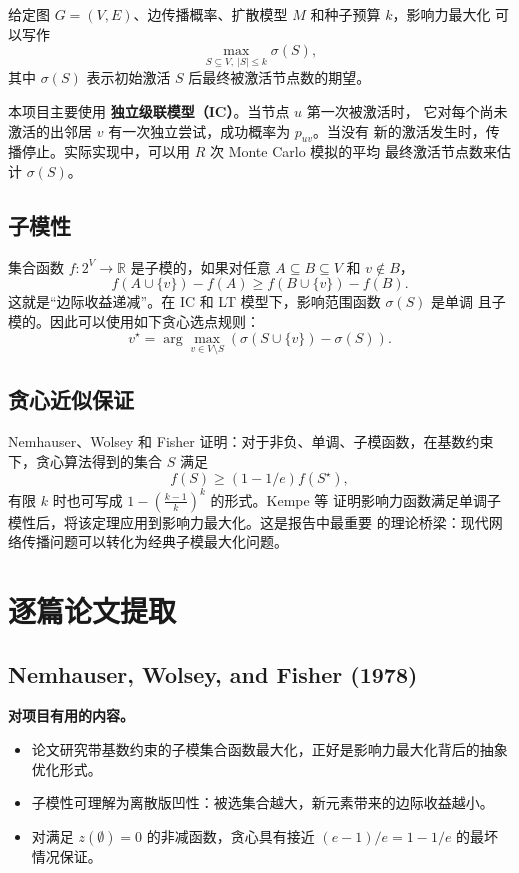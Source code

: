 \documentclass[UTF8,10pt]{ctexart}
\begin{document}
给定图 $G=(V,E)$、边传播概率、扩散模型 $M$ 和种子预算 $k$，影响力最大化
可以写作
\[
    \max_{S\subseteq V,\ |S|\le k} \sigma(S),
\]
其中 $\sigma(S)$ 表示初始激活 $S$ 后最终被激活节点数的期望。

本项目主要使用 \textbf{独立级联模型（IC）}。当节点 $u$ 第一次被激活时，
它对每个尚未激活的出邻居 $v$ 有一次独立尝试，成功概率为 $p_{uv}$。当没有
新的激活发生时，传播停止。实际实现中，可以用 $R$ 次 Monte Carlo 模拟的平均
最终激活节点数来估计 $\sigma(S)$。

\subsection{子模性}

集合函数 $f:2^V\rightarrow \mathbb{R}$ 是子模的，如果对任意
$A\subseteq B\subseteq V$ 和 $v\notin B$，
\[
    f(A\cup\{v\})-f(A)\ge f(B\cup\{v\})-f(B).
\]
这就是“边际收益递减”。在 IC 和 LT 模型下，影响范围函数 $\sigma(S)$ 是单调
且子模的。因此可以使用如下贪心选点规则：
\[
    v^\star=\arg\max_{v\in V\setminus S}
    \left(\sigma(S\cup\{v\})-\sigma(S)\right).
\]

\subsection{贪心近似保证}

Nemhauser、Wolsey 和 Fisher 证明：对于非负、单调、子模函数，在基数约束
下，贪心算法得到的集合 $S$ 满足
\[
    f(S)\ge (1-1/e) f(S^\star),
\]
有限 $k$ 时也可写成 $1-\left(\frac{k-1}{k}\right)^k$ 的形式。Kempe 等
证明影响力函数满足单调子模性后，将该定理应用到影响力最大化。这是报告中最重要
的理论桥梁：现代网络传播问题可以转化为经典子模最大化问题。

\section{逐篇论文提取}

\subsection{Nemhauser, Wolsey, and Fisher (1978)}

\textbf{对项目有用的内容。}
\begin{itemize}
\item 论文研究带基数约束的子模集合函数最大化，正好是影响力最大化背后的抽象优化形式。
\item 子模性可理解为离散版凹性：被选集合越大，新元素带来的边际收益越小。
\item 对满足 $z(\emptyset)=0$ 的非减函数，贪心具有接近 $(e-1)/e=1-1/e$ 的最坏情况保证。
\end{itemize}
\end{document}

